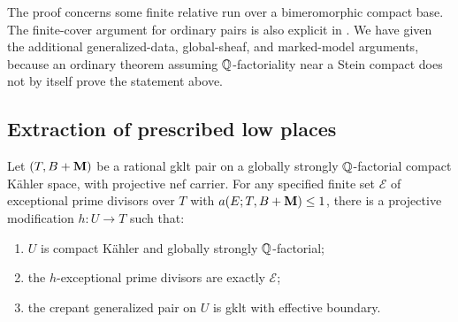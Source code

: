 \begin{remark}
The proof concerns some finite relative run over a bimeromorphic
compact base.  The finite-cover argument for ordinary pairs is also
explicit in \cite[Theorems~2.1 and~2.4]{FujinoCompact2026}.  We have
given the additional generalized-data, global-sheaf, and marked-model
arguments, because an ordinary theorem assuming $\mathbb Q$-factoriality near
a Stein compact does not by itself prove the statement above.
\end{remark}

\subsection{Extraction of prescribed low places}

\begin{proposition}\label{prop:extraction}
Let $(T,B+\mathbf M)$ be a rational gklt pair on a globally strongly
$\mathbb Q$-factorial compact K\"ahler space, with projective nef carrier.
For any specified finite set $\mathcal E$ of exceptional prime
divisors over $T$ with
$a(E;T,B+\mathbf M)\leq1$, there is a projective modification
$h\colon U\to T$ such that:
\begin{enumerate}[label=\textup{(\roman*)}]
\item $U$ is compact K\"ahler and globally strongly $\mathbb Q$-factorial;
\item the $h$-exceptional prime divisors are exactly $\mathcal E$;
\item the crepant generalized pair on $U$ is gklt with effective
boundary.
\end{enumerate}
\end{proposition}


